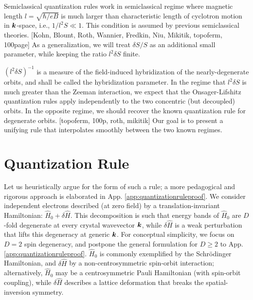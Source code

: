\documentclass[aps, prb, showpacs, twocolumn, notitlepage, superscriptaddress]{revtex4-1}
\begin{document}
Semiclassical quantization rules work in semiclassical regime where magnetic length $l=\sqrt{\hbar/eB}$ is much larger than characteristic length of cyclotron motion in $\boldsymbol{k}$-space, i.e., $1/l^2 S\ll 1$. This condition is assumed by previous semiclassical theories. [Kohn, Blount, Roth, Wannier, Fredkin, Niu, Mikitik, topoferm, 100page] As a generalization, we will treat $\delta S/S$ as an additional small parameter, while keeping the ratio $l^2\delta S$ finite. 

$(l^2\delta S)^{-1}$ is a measure of the field-induced hybridization of the nearly-degenerate orbits, and shall be called the hybridization parameter. 
In the regime that $l^2\delta S$ is much greater than the Zeeman interaction, we expect that the Onsager-Lifshitz quantization rules apply independently to the two concentric (but decoupled) orbits. In the opposite regime, we should recover the known quantization rule for degenerate orbits. [topoferm, 100p, roth, mikitik] Our goal is to present a unifying rule that interpolates smoothly between the two known regimes.

\section{Quantization Rule\label{sec:qtznrules}}

Let us heuristically argue for the form of such a rule; a more pedagogical and rigorous approach is elaborated in App. \ref{app:quantizationruleproof}. We consider independent electrons described (at zero field) by a translation-invariant Hamiltonian: $\hat{H}_0{+}\delta \hat{H}$. This decomposition is such that energy bands of $\hat{H}_0$ are $D$-fold degenerate at every crystal wavevector $\boldsymbol{k}$, while $\delta \hat{H}$ is a weak perturbation that lifts this degeneracy at generic $\boldsymbol{k}$. For conceptual simplicity, we focus on $D{=}2$ spin degeneracy, and postpone the general formulation for $D{\geq}2$ to App. \ref{app:quantizationruleproof}.  $\hat{H}_0$ is commonly exemplified by  the Schr\"odinger Hamiltonian, and $\delta \hat{H}$ by a non-centrosymmetric spin-orbit interaction; alternatively, $\hat{H}_0$ may be a centrosymmetric Pauli Hamiltonian (with spin-orbit coupling), while $\delta \hat{H}$ describes a lattice deformation that breaks the spatial-inversion symmetry.
\end{document}
